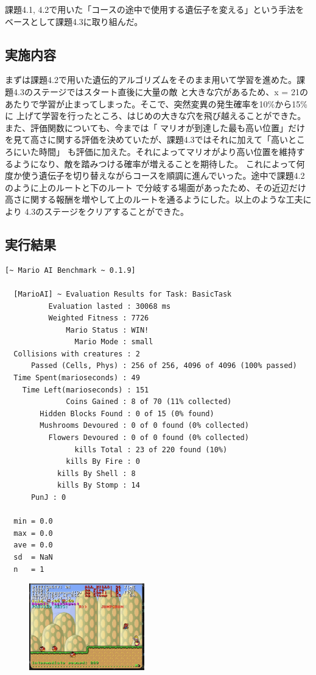 \documentclass[a4paper,11pt]{jsarticle}
\begin{document}
{課題4.1, 4.2で用いた「コースの途中で使用する遺伝子を変える」という手法をベースとして課題4.3に取り組んだ。

\subsection*{実施内容}

まずは課題4.2で用いた遺伝的アルゴリズムをそのまま用いて学習を進めた。課題4.3のステージではスタート直後に大量の敵
と大きな穴があるため、x = 21のあたりで学習が止まってしまった。そこで、突然変異の発生確率を10\%から15\%に
上げて学習を行ったところ、はじめの大きな穴を飛び越えることができた。また、評価関数についても、今までは「
マリオが到達した最も高い位置」だけを見て高さに関する評価を決めていたが、課題4.3ではそれに加えて「高いところにいた時間」
も評価に加えた。それによってマリオがより高い位置を維持するようになり、敵を踏みつける確率が増えることを期待した。
これによって何度か使う遺伝子を切り替えながらコースを順調に進んでいった。途中で課題4.2のように上のルートと下のルート
で分岐する場面があったため、その近辺だけ高さに関する報酬を増やして上のルートを通るようにした。以上のような工夫により
4.3のステージをクリアすることができた。

\subsection*{実行結果}

\begin{lstlisting}[caption=実行結果]
  [~ Mario AI Benchmark ~ 0.1.9]

  [MarioAI] ~ Evaluation Results for Task: BasicTask
          Evaluation lasted : 30068 ms
          Weighted Fitness : 7726
              Mario Status : WIN!
                Mario Mode : small
  Collisions with creatures : 2
      Passed (Cells, Phys) : 256 of 256, 4096 of 4096 (100% passed)
  Time Spent(marioseconds) : 49
    Time Left(marioseconds) : 151
              Coins Gained : 8 of 70 (11% collected)
        Hidden Blocks Found : 0 of 15 (0% found)
        Mushrooms Devoured : 0 of 0 found (0% collected)
          Flowers Devoured : 0 of 0 found (0% collected)
                kills Total : 23 of 220 found (10%)
              kills By Fire : 0
            kills By Shell : 8
            kills By Stomp : 14
      PunJ : 0

  min = 0.0
  max = 0.0
  ave = 0.0
  sd  = NaN
  n   = 1
\end{lstlisting}

\begin{figure}
  \begin{center}
    \includegraphics*[width=50mm]{images/report3/reaching-goal.png}
  \end{center}
\end{figure}

}
\end{document}
